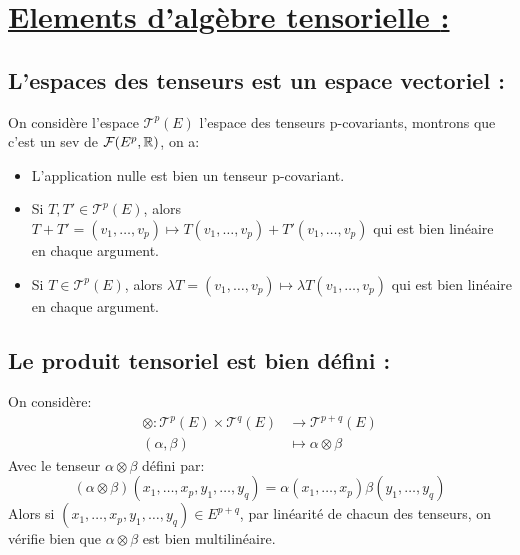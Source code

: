 \section*{\uline{Elements d'algèbre tensorielle {:}}}
   \subsection*{L'espaces des tenseurs est un espace vectoriel {:}}
On considère l'espace \( \mathscr{T}^p(E) \) l'espace des tenseurs p-covariants, montrons que c'est un sev de \( \mathcal{F}(E^p, \mathbb{R}) \), on a:
\begin{itemize}
   \item L'application nulle est bien un tenseur p-covariant.
   \item Si \( T, T' \in \mathscr{T}^p(E)\), alors \( T + T' = (v_1, \ldots, v_p) \mapsto T(v_1, \ldots, v_p) + T'(v_1, \ldots, v_p) \) qui est bien linéaire en chaque argument.
   \item Si \( T \in \mathscr{T}^p(E)\), alors \( \lambda T = (v_1, \ldots, v_p) \mapsto \lambda T(v_1, \ldots, v_p) \) qui est bien linéaire en chaque argument.
\end{itemize}
   \subsection*{Le produit tensoriel est bien défini {:}}
On considère: 
\begin{align*}
   \otimes : \mathscr{T}^p(E) \times \mathscr{T}^q(E) &\longrightarrow \mathscr{T}^{p+q}(E)\\
   (\alpha, \beta) &\longmapsto \alpha \otimes \beta
\end{align*}
Avec le tenseur \(\alpha \otimes \beta\) défini par:
\[
   (\alpha \otimes \beta)(x_1, \ldots, x_p, y_1, \ldots, y_q) = \alpha(x_1, \ldots, x_p)\beta(y_1, \ldots, y_q)
\]
Alors si \( (x_1, \ldots, x_p, y_1, \ldots, y_q) \in E^{p+q} \), par linéarité de chacun des tenseurs, on vérifie bien que \( \alpha \otimes \beta \) est bien multilinéaire.

